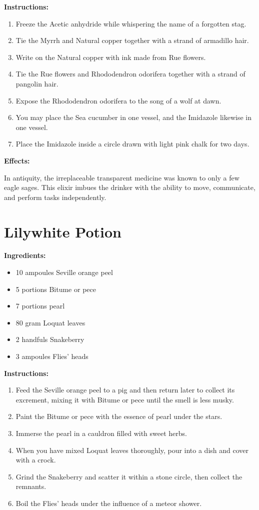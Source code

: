 \documentclass{article}
\begin{document}
\textbf{Instructions:}

\begin{enumerate}
  \item Freeze the Acetic anhydride while whispering the name of a forgotten stag.
  \item Tie the Myrrh and Natural copper together with a strand of armadillo hair.
  \item Write on the Natural copper with ink made from Rue flowers.
  \item Tie the Rue flowers and Rhododendron odorifera together with a strand of pangolin hair.
  \item Expose the Rhododendron odorifera to the song of a wolf at dawn.
  \item You may place the Sea cucumber in one vessel, and the Imidazole likewise in one vessel.
  \item Place the Imidazole inside a circle drawn with light pink chalk for two days.
\end{enumerate}

\textbf{Effects:}

In antiquity, the irreplaceable transparent medicine was known to only a few eagle sages. This elixir imbues the drinker with the ability to move, communicate, and perform tasks independently.

\newpage
\section*{Lilywhite Potion}

\textbf{Ingredients:}

\begin{itemize}
  \item 10 ampoules Seville orange peel
  \item 5 portions Bitume or pece
  \item 7 portions pearl
  \item 80 gram Loquat leaves
  \item 2 handfuls Snakeberry
  \item 3 ampoules Flies' heads
\end{itemize}

\textbf{Instructions:}

\begin{enumerate}
  \item Feed the Seville orange peel to a pig and then return later to collect its excrement, mixing it with Bitume or pece until the smell is less musky.
  \item Paint the Bitume or pece with the essence of pearl under the stars.
  \item Immerse the pearl in a cauldron filled with sweet herbs.
  \item When you have mixed Loquat leaves thoroughly, pour into a dish and cover with a crock.
  \item Grind the Snakeberry and scatter it within a stone circle, then collect the remnants.
  \item Boil the Flies' heads under the influence of a meteor shower.
\end{enumerate}
\end{document}
